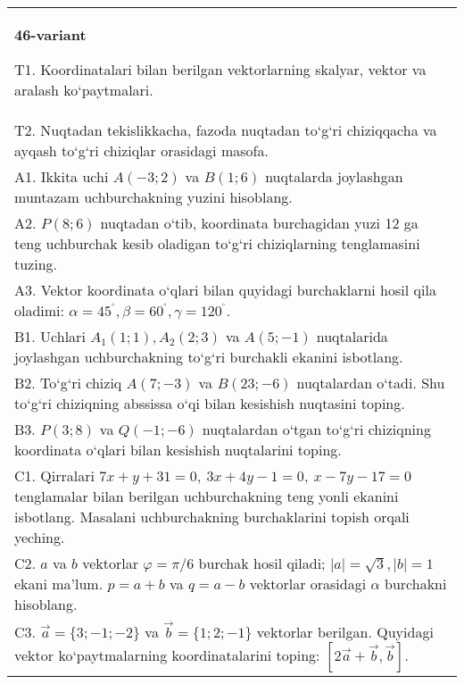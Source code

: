 \documentclass{article}
\begin{document}
\begin{tabular}{m{17cm}}
\textbf{46-variant}

T1. 
Koordinatalari bilan berilgan vektorlarning skalyar, vektor va aralash ko‘paytmalari.
 \\
T2. 
Nuqtadan tekislikkacha, fazoda nuqtadan to‘g‘ri chiziqqacha va ayqash to‘g‘ri chiziqlar orasidagi masofa.
 \\
A1. 
Ikkita uchi $A (-3; 2) $ va $B (1; 6) $ nuqtalarda
joylashgan muntazam uchburchakning yuzini hisoblang.
 \\
A2. 
$P (8;6) $ nuqtadan o‘tib, koordinata burchagidan
yuzi 12 ga teng uchburchak kesib oladigan to‘g‘ri chiziqlarning tenglamasini
tuzing.
 \\
A3. 
Vektor koordinata o‘qlari bilan quyidagi burchaklarni hosil qila oladimi:
$\alpha = 45^{{^\circ}},\beta = 60^{{^\circ}},\gamma = 120^{{^\circ}}$.
 \\
B1. 
Uchlari $A_1 (1; 1), A_2 (2; 3) $ va $A (5;-1) $
nuqtalarida joylashgan uchburchakning to‘g‘ri burchakli ekanini isbotlang.
 \\
B2. 
To‘g‘ri chiziq \(A (7;-3) \) va \(B (23;-6) \) nuqtalardan o‘tadi.
Shu to‘g‘ri chiziqning abssissa o‘qi bilan kesishish nuqtasini toping.
 \\
B3. 
\(P (3;8) \) va \(Q (-1;-6) \) nuqtalardan o‘tgan
to‘g‘ri chiziqning koordinata o‘qlari bilan kesishish nuqtalarini toping.
 \\
C1. 
Qirralari
\(7x+y+31=0,\ 3x+4y-1=0,\ x-7y-17=0\) tenglamalar
bilan berilgan uchburchakning teng yonli ekanini isbotlang.
Masalani uchburchakning
burchaklarini topish orqali yeching.
 \\
C2. 
$a$ va $b$ vektorlar $\varphi = \pi/6$ burchak hosil qiladi; $|a| = \sqrt{3},|b| = 1$ ekani ma’lum. $p = a + b$ va $q = a - b$ vektorlar orasidagi $\alpha$ burchakni hisoblang.
 \\
C3. 
$\vec{a} = \{ 3; - 1; - 2\}$ va $\vec{b} = \{ 1;2; - 1\}$ vektorlar berilgan. Quyidagi vektor ko‘paytmalarning koordinatalarini toping:
$\left\lbrack 2\vec{a} + \vec{b},\vec{b} \right\rbrack$.
 \\

\end{tabular}
\vspace{1cm}
\end{document}
